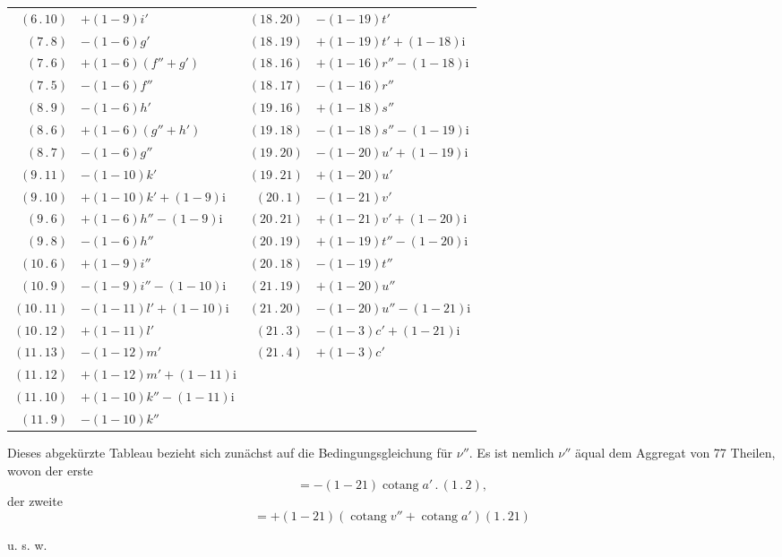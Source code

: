 \begin{center}
\begin{tabular}{|r|l||r|l|}
\((6\,.\,10)\)&\(+(1-9)i'\)&\((18\,.\,20)\)&\(-(1-19)t'\)\\
\((7\,.\,8)\)&\(-(1-6)g'\)&\((18\,.\,19)\)&\(+(1-19)t'+(1-18)\mathrm{i}\)\\
\((7\,.\,6)\)&\(+(1-6)(f''+g')\)&\((18\,.\,16)\)&\(+(1-16)r''-(1-18)\mathrm{i}\)\\
\((7\,.\,5)\)&\(-(1-6)f''\)&\((18\,.\,17)\)&\(-(1-16)r''\)\\
\((8\,.\,9)\)&\(-(1-6)h'\)&\((19\,.\,16)\)&\(+(1-18)s''\)\\
\((8\,.\,6)\)&\(+(1-6)(g''+h')\)&\((19\,.\,18)\)&\(-(1-18)s''-(1-19)\mathrm{i}\)\\
\((8\,.\,7)\)&\(-(1-6)g''\)&\((19\,.\,20)\)&\(-(1-20)u'+(1-19)\mathrm{i}\)\\
\((9\,.\,11)\)&\(-(1-10)k'\)&\((19\,.\,21)\)&\(+(1-20)u'\)\\
\((9\,.\,10)\)&\(+(1-10)k'+(1-9)\mathrm{i}\)&\((20\,.\,1)\)&\(-(1-21)v'\)\\
\((9\,.\,6)\)&\(+(1-6)h''-(1-9)\mathrm{i}\)&\((20\,.\,21)\)&\(+(1-21)v'+(1-20)\mathrm{i}\)\\
\((9\,.\,8)\)&\(-(1-6)h''\)&\((20\,.\,19)\)&\(+(1-19)t''-(1-20)\mathrm{i}\)\\
\((10\,.\,6)\)&\(+(1-9)i''\)&\((20\,.\,18)\)&\(-(1-19)t''\)\\
\((10\,.\,9)\)&\(-(1-9)i''-(1-10)\mathrm{i}\)&\((21\,.\,19)\)&\(+(1-20)u''\)\\
\((10\,.\,11)\)&\(-(1-11)l'+(1-10)\mathrm{i}\)&\((21\,.\,20)\)&\(-(1-20)u''-(1-21)\mathrm{i}\)\\
\((10\,.\,12)\)&\(+(1-11)l'\)&\((21\,.\,3)\)&\(-(1-3)c'+(1-21)\mathrm{i}\)\\
\((11\,.\,13)\)&\(-(1-12)m'\)&\((21\,.\,4)\)&\(+(1-3)c'\)\\
\((11\,.\,12)\)&\(+(1-12)m'+(1-11)\mathrm{i}\)&&\\
\((11\,.\,10)\)&\(+(1-10)k''-(1-11)\mathrm{i}\)&&\\
\((11\,.\,9)\)&\(-(1-10)k''\)&&\\
\end{tabular}
\end{center}
\endgroup
\clearpage
\noindent\makebox[12mm][l]{}%
%
\par\nobreak\medskip
\par Dieses abgekürzte Tableau bezieht sich zunächst auf die Bedingungsgleichung für \(\nu''\). Es ist nemlich \(\nu''\) äqual dem Aggregat von 77 Theilen, wovon der erste
\[
=-(1-21)\operatorname{cotang}a'\,.\,(1\,.\,2),
\]
\noindent der zweite
\[
=+(1-21)(\operatorname{cotang}v''+\operatorname{cotang}a')(1\,.\,21)
\]
\begin{center}u. s. w.\end{center}

